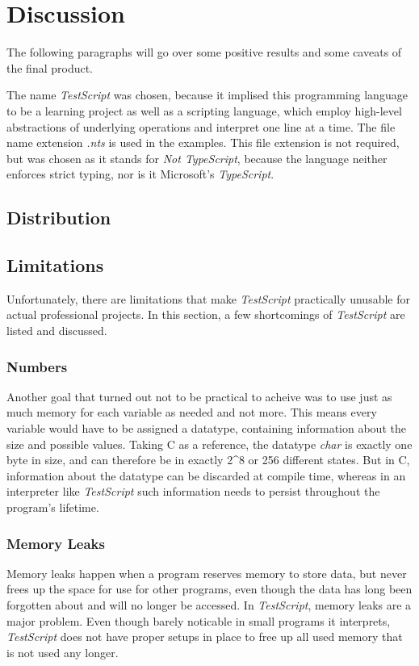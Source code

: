 \documentclass[12pt,a4paper]{article}
\newcommand{\name}{\emph{TestScript}}
\begin{document}

\section{Discussion}
The following paragraphs will go over some positive results and some caveats of the
final product.

The name \name{} was chosen, because it implised this programming language
to be a learning project as well as a scripting language, which employ
high-level abstractions of underlying operations and interpret one line
at a time. The file name extension \emph{.nts} is used in the examples. This
file extension is not required, but was chosen as it stands for \emph{Not TypeScript}, because
the language neither enforces strict typing, nor is it Microsoft's \emph{TypeScript}.

\subsection{Distribution}

\subsection{Limitations}\label{Limitations}
Unfortunately, there are limitations that make \name{} practically unusable for actual
professional projects. In this section, a few shortcomings of \name{} are listed
and discussed.

\subsubsection{Numbers}
Another goal that turned out not to be practical to acheive was to use just as much
memory for each variable as needed and not more. This means every variable would
have to be assigned a datatype, containing information about the size and possible values.
Taking C as a reference, the datatype \emph{char} is exactly one byte in size, and
can therefore be in exactly 2^8 or 256 different states. But in C, information about
the datatype can be discarded at compile time, whereas in an interpreter like \name{} such
information needs to persist throughout the program's lifetime.

\subsubsection{Memory Leaks}\label{memleaks}
Memory leaks happen when a program reserves memory to store data, but
never frees up the space for use for other programs, even though the data
has long been forgotten about and will no longer be accessed.
In \name{}, memory leaks are a major problem. Even though barely noticable in small
programs it interprets, \name{} does not have proper setups in place to free up
all used memory that is not used any longer.
\end{document}
